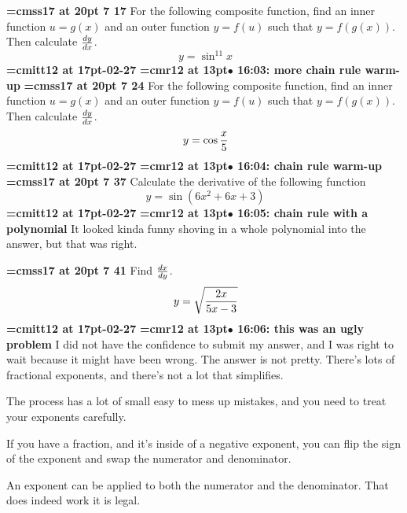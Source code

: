 {\medskip\noindent\bf\font\titlefont=cmss17 at 20pt 7 17}\medskip
For the following composite function, find an inner function
$u = g(x)$ and an outer function $y = f(u)$ such that
$y = f(g(x))$. Then calculate $dy \over dx$.
$$\
y = \sin^{11}x
$$
{\medskip\noindent\bf\font\titlefont=cmitt12 at 17pt-02-27}\medskip
{\smallskip\noindent\bf\font\titlefont=cmr12 at 13pt\titlefont $\bullet$ 16:03: more chain rule warm-up}\smallskip
\xrdef{node81}
{\medskip\noindent\bf\font\titlefont=cmss17 at 20pt 7 24}\medskip
For the following composite function, find an inner function
$u = g(x)$ and an outer function $y = f(u)$ such that
$y = f(g(x))$. Then calculate $dy \over dx$.
$$\
y = \cos{x \over 5}
$$
{\medskip\noindent\bf\font\titlefont=cmitt12 at 17pt-02-27}\medskip
{\smallskip\noindent\bf\font\titlefont=cmr12 at 13pt\titlefont $\bullet$ 16:04: chain rule warm-up}\smallskip
\xrdef{node82}
{\medskip\noindent\bf\font\titlefont=cmss17 at 20pt\titlefont 3 7 37}\medskip
Calculate the derivative of the following function
$$\
y = \sin(6x^2 + 6x + 3)
$$
{\medskip\noindent\bf\font\titlefont=cmitt12 at 17pt-02-27}\medskip
{\smallskip\noindent\bf\font\titlefont=cmr12 at 13pt\titlefont $\bullet$ 16:05: chain rule with a polynomial}\smallskip
It looked kinda funny shoving in a whole polynomial into the answer, but that was right.
\par

\xrdef{node83}
{\medskip\noindent\bf\font\titlefont=cmss17 at 20pt 7 41}\medskip
Find ${dx \over dy}$.
$$\
y = \sqrt{2x \over 5x - 3}
$$
{\medskip\noindent\bf\font\titlefont=cmitt12 at 17pt-02-27}\medskip
{\smallskip\noindent\bf\font\titlefont=cmr12 at 13pt\titlefont $\bullet$ 16:06: this was an ugly problem}\smallskip
I did not have the confidence to submit my answer, and I was right to wait because it might have been wrong. The answer is not pretty. There's lots of fractional exponents, and there's not a lot that simplifies.
\par

The process has a lot of small easy to mess up mistakes, and you need to treat your exponents carefully.
\par

If you have a fraction, and it's inside of a negative exponent, you can flip the sign of the exponent and swap the numerator and denominator.
\par

An exponent can be applied to both the numerator and the denominator. That does indeed work it is legal.
\par

